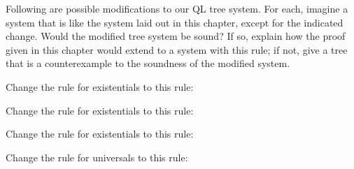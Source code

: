 \solutions
\problempart
\label{pr.QLalttrees-sound}
Following are possible modifications to our QL tree system. For each, imagine a system that is like the system laid out in this chapter, except for the indicated change. Would the modified tree system be sound? If so, explain how the proof given in this chapter would extend to a system with this rule; if not, give a tree that is a counterexample to the soundness of the modified system.
\begin{earg}
\item Change the rule for existentials to this rule:
	
\item Change the rule for existentials to this rule:

\item Change the rule for existentials to this rule:

\item Change the rule for universals to this rule:


\end{earg}
